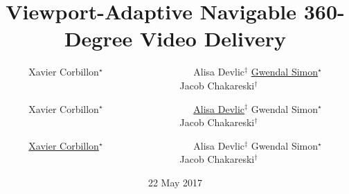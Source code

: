 \documentclass[t,12pt,pdftex, aspectratio=1610]{beamer}
\title[Viewport-Adaptive Navigable 360-Degree Video Delivery]{\Large
Viewport-Adaptive Navigable 360-Degree Video Delivery\newline}
\author[Gwendal Simon et al.]{\hspace{-2.5pt}Xavier
Corbillon$^{\star}$ \hfill ~~~~~~~~~~~~~~~~~~Alisa Devlic$^{\ddagger}$
\newline \underline{Gwendal Simon}$^{\star}$ \hfill ~~~~~~~~~~~~~~~~~~Jacob Chakareski$^{\dagger}$}
\author[Alisa Devlic et al.]{\hspace{-2.5pt}Xavier
	Corbillon$^{\star}$ \hfill ~~~~~~~~~~~~~~~~~~\underline{Alisa Devlic}$^{\ddagger}$
	\newline Gwendal Simon$^{\star}$ \hfill ~~~~~~~~~~~~~~~~~~Jacob Chakareski$^{\dagger}$}
\author[Xavier Corbillon et al.]{\hspace{-2.5pt}\underline{Xavier
	Corbillon}$^{\star}$ \hfill ~~~~~~~~~~~~~~~~~~Alisa Devlic$^{\ddagger}$
	\newline Gwendal Simon$^{\star}$ \hfill ~~~~~~~~~~~~~~~~~~Jacob Chakareski$^{\dagger}$}
\date{22 May 2017}
\begin{document}



\inserttitlepage

\newcommand\insertTableOfContents{

\begin{frame}[c,noframenumbering]
	\frametitle{Table of contents}
	\tableofcontents[hideallsubsections]
\end{frame}
}

\newcommand\defineContentTable{
    \AtBeginSection[] {
     \begin{frame}[c,noframenumbering]
     \frametitle{Table of contents}
       \small \tableofcontents[hideallsubsections,sectionstyle=show/shaded,subsectionstyle=hide/hide/hide ]
     \end{frame}
    }
}





\end{document}
